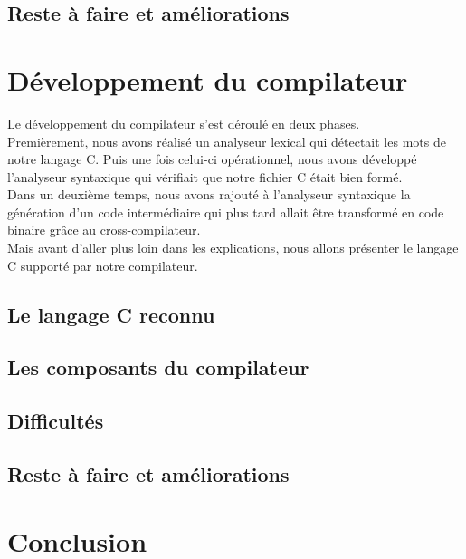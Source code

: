 \documentclass[a4paper]{report}
\begin{document}
\newpage

\section{Reste à faire et améliorations}


\newpage

\chapter{Développement du compilateur}

Le développement du compilateur s'est déroulé en deux phases.\\
Premièrement, nous avons réalisé un analyseur lexical qui détectait les mots de notre langage C. Puis une fois celui-ci opérationnel, nous avons développé l'analyseur syntaxique qui vérifiait que notre fichier C était bien formé.\\
Dans un deuxième temps, nous avons rajouté à l'analyseur syntaxique la génération d'un code intermédiaire qui plus tard allait être transformé en code binaire grâce au cross-compilateur.\\
Mais avant d'aller plus loin dans les explications, nous allons présenter le langage C supporté par notre compilateur.

\newpage

\section{Le langage C reconnu}


\section{Les composants du compilateur}


\section{Difficultés}


\section{Reste à faire et améliorations}


\newpage

\chapter*{Conclusion} 

 
\end{document}
